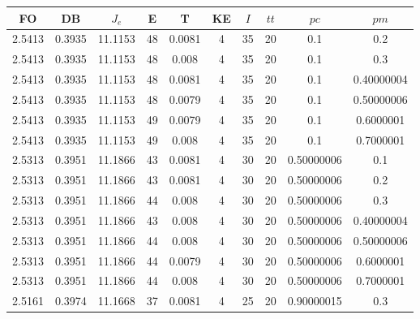 \begin{table}[h!]
    \footnotesize
    \begin{center}
        \begin{tabular}{|c|c|c|c|c|c|c|c|c|c|}
        \hline
            {\bf FO} & {\bf DB} & $J_e$ & {\bf E} & {\bf T} & {\bf KE} & $I$ & $tt$ & $pc$ & $pm$ \\
        \hline
        \hline
            2.5413 & 0.3935  & 11.1153 & 48 & 0.0081 & 4 & 35 & 20 & 0.1 & 0.2\\
        \hline
        \hline
            2.5413 & 0.3935  & 11.1153 & 48 & 0.008 & 4 & 35 & 20 & 0.1 & 0.3\\
        \hline
        \hline
            2.5413 & 0.3935  & 11.1153 & 48 & 0.0081 & 4 & 35 & 20 & 0.1 & 0.40000004\\
        \hline
        \hline
            2.5413 & 0.3935  & 11.1153 & 48 & 0.0079 & 4 & 35 & 20 & 0.1 & 0.50000006\\
        \hline
        \hline
            2.5413 & 0.3935  & 11.1153 & 49 & 0.0079 & 4 & 35 & 20 & 0.1 & 0.6000001\\
        \hline
        \hline
            2.5413 & 0.3935  & 11.1153 & 49 & 0.008 & 4 & 35 & 20 & 0.1 & 0.7000001\\
        \hline
        \hline
            2.5313 & 0.3951  & 11.1866 & 43 & 0.0081 & 4 & 30 & 20 & 0.50000006 & 0.1\\
        \hline
        \hline
            2.5313 & 0.3951  & 11.1866 & 43 & 0.0081 & 4 & 30 & 20 & 0.50000006 & 0.2\\
        \hline
        \hline
            2.5313 & 0.3951  & 11.1866 & 44 & 0.008 & 4 & 30 & 20 & 0.50000006 & 0.3\\
        \hline
        \hline
            2.5313 & 0.3951  & 11.1866 & 43 & 0.008 & 4 & 30 & 20 & 0.50000006 & 0.40000004\\
        \hline
        \hline
            2.5313 & 0.3951  & 11.1866 & 44 & 0.008 & 4 & 30 & 20 & 0.50000006 & 0.50000006\\
        \hline
        \hline
            2.5313 & 0.3951  & 11.1866 & 44 & 0.0079 & 4 & 30 & 20 & 0.50000006 & 0.6000001\\
        \hline
        \hline
            2.5313 & 0.3951  & 11.1866 & 44 & 0.008 & 4 & 30 & 20 & 0.50000006 & 0.7000001\\
        \hline
        \hline
            2.5161 & 0.3974  & 11.1668 & 37 & 0.0081 & 4 & 25 & 20 & 0.90000015 & 0.3\\
        \hline

\end{tabular}
\end{center}
\end{table}
